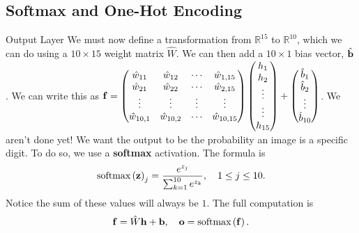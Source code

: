 \documentclass[xcolor=dvipsnames, fontsize=11pt, %
pagesize, %
parskip=half-, t]{beamer}
\begin{document}
\subsection{Softmax and One-Hot Encoding}
\begin{frame}{Output Layer}
We must now define a transformation from $\mathbb{R}^{15}$ to $\mathbb{R}^{10}$, which we can do using a $10\times 15$ weight matrix $\hat{W}$. We can then add a $10\times 1$ bias vector, $\hat{\bold{b}}$. \pause We can write this as $\bold{f}=\begin{pmatrix} \hat{w}_{11} & \hat{w}_{12} & \cdots & \hat{w}_{1,15} \\ \hat{w}_{21} & \hat{w}_{22} & \cdots & \hat{w}_{2,15} \\ \vdots & \vdots & \vdots & \vdots \\ \hat{w}_{10,1} & \hat{w}_{10,2} & \cdots & \hat{w}_{10,15} \end{pmatrix}\begin{pmatrix} h_{1} \\ h_2 \\ \vdots \\ \vdots \\ h_{15} \end{pmatrix}+\begin{pmatrix} \hat{b}_{1} \\ \hat{b}_2 \\ \vdots \\ \hat{b}_{10} \end{pmatrix}$. \pause We aren't done yet! We want the output to be the probability an image is a specific digit. \pause To do so, we use a \textbf{softmax} activation. The formula is $$\displaystyle \text{softmax}\left(\bold{z}\right)_{j}=\frac{e^{z_j}}{\sum_{k=1}^{10}e^{z_k}}, \quad 1\le j \le 10.$$ Notice the sum of these values will always be $1$. \pause The full computation is $$\bold{f}=\hat{W}\bold{h}+\bold{b}, \quad \bold{o}=\text{softmax}\left(\bold{f}\right).$$  
  \end{frame}
\end{document}
